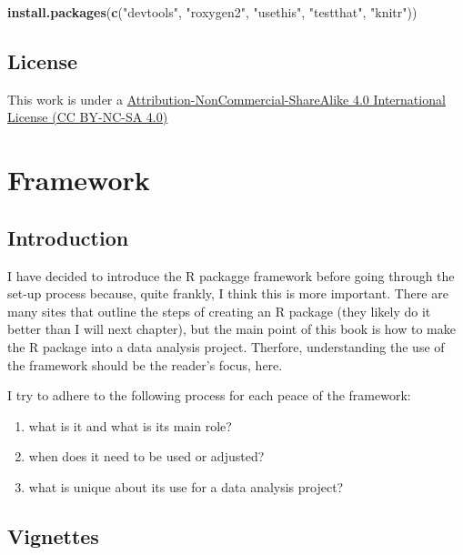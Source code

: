 \documentclass[]{book}
\newenvironment{Shaded}{\begin{snugshade}}{\end{snugshade}}
\newcommand{\KeywordTok}[1]{\textcolor[rgb]{0.13,0.29,0.53}{\textbf{#1}}}
\newcommand{\StringTok}[1]{\textcolor[rgb]{0.31,0.60,0.02}{#1}}
\newcommand{\NormalTok}[1]{#1}
\providecommand{\tightlist}{%
  \setlength{\itemsep}{0pt}\setlength{\parskip}{0pt}}
\begin{document}
\begin{Shaded}
\begin{Highlighting}[]
\KeywordTok{install.packages}\NormalTok{(}\KeywordTok{c}\NormalTok{(}\StringTok{"devtools"}\NormalTok{, }\StringTok{"roxygen2"}\NormalTok{, }\StringTok{"usethis"}\NormalTok{, }\StringTok{"testthat"}\NormalTok{, }\StringTok{"knitr"}\NormalTok{))}
\end{Highlighting}
\end{Shaded}

\section*{License}\label{license}

This work is under a
\href{http://creativecommons.org/licenses/by-nc-sa/4.0/}{Attribution-NonCommercial-ShareAlike
4.0 International License (CC BY-NC-SA 4.0)}

\chapter{Framework}\label{framework}

\section{Introduction}\label{introduction}

I have decided to introduce the R packagge framework before going
through the set-up process because, quite frankly, I think this is more
important. There are many sites that outline the steps of creating an R
package (they likely do it better than I will next chapter), but the
main point of this book is how to make the R package into a data
analysis project. Therfore, understanding the use of the framework
should be the reader's focus, here.

I try to adhere to the following process for each peace of the
framework:

\begin{enumerate}
\def\labelenumi{\arabic{enumi}.}
\tightlist
\item
  what is it and what is its main role?
\item
  when does it need to be used or adjusted?
\item
  what is unique about its use for a data analysis project?
\end{enumerate}

\section{Vignettes}\label{vignettes}
\end{document}
